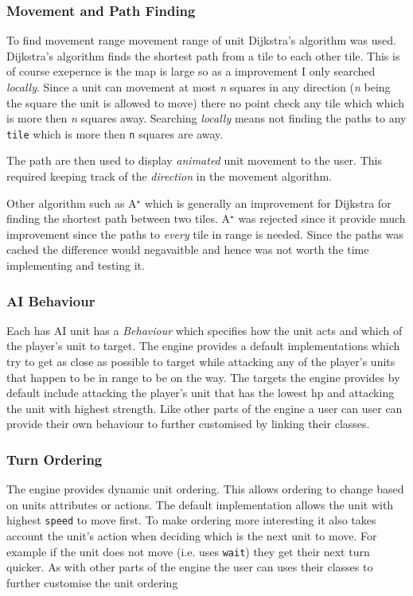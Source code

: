 \subsubsection{Movement and Path Finding}

To find movement range movement range of unit Dijkstra's algorithm was used. Dijkstra's algorithm finds the shortest path from a tile to each other tile. This is of course exepernce is the map is large so as a improvement I only searched \emph{locally}. Since a unit can movement at most \emph{n} squares in any direction (\emph{n} being the square the unit is allowed to move) there no point check any tile which which is more then \emph{n} squares away.  Searching \emph{locally} means not finding the paths to any \texttt{tile} which is more then \texttt{n} squares are away.

The path are then used to display \emph{animated} unit movement to the user.  This required keeping track of the \emph{direction} in the movement algorithm. 

\def\astar{A$^{\star}$ }

Other algorithm such as \astar which is generally an improvement for Dijkstra for finding the shortest path between two tiles. \astar was rejected since it provide much improvement since the paths to \emph{every} tile in range is needed. Since the paths was cached the difference would negavaitble and hence was not worth the time implementing and testing it.


\subsubsection{AI Behaviour}
Each has AI unit has a \emph{Behaviour} which specifies how the unit acts and which of the player's unit to target.  The engine provides a default implementations which try to get as close as possible to target while attacking any of the player's units that happen to be in range to be on the way.  The targets the engine provides by default include attacking the player's unit that has the lowest hp and attacking the unit with highest strength. Like other parts of the engine a user can user can provide their own behaviour to further customised by linking their classes.

\subsubsection{Turn Ordering}
The engine provides dynamic unit ordering.  This allows ordering to change based on units attributes or actions.  The default implementation allows the unit with highest \texttt{speed} to move first.  To make ordering more interesting it also takes account the unit's action when deciding which is the next unit to move. For example if the unit does not move (i.e. uses \texttt{wait}) they get their next turn quicker. As with other parts of the engine the user can uses their classes to further customise the unit ordering

